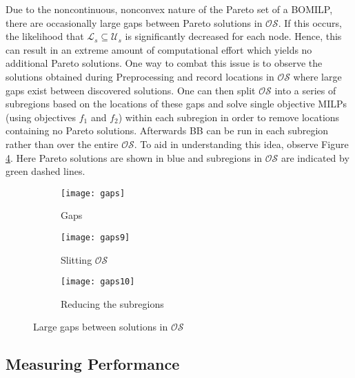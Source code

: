 \documentclass[11.5pt]{article}
\newcommand{\U}{\mathcal{U}}
\renewcommand{\L}{\mathcal{L}}
\newcommand{\OS}{\mathcal{OS}}
\begin{document}
Due to the noncontinuous, nonconvex nature of the Pareto set of a BOMILP, there are occasionally large gaps between Pareto solutions in $\OS$. If this occurs, the likelihood that $\L_s \subseteq \U_s$ is significantly decreased for each node. Hence, this can result in an extreme amount of computational effort which yields no additional Pareto solutions. One way to combat this issue is to observe the solutions obtained during Preprocessing and record locations in $\OS$ where large gaps exist between discovered solutions. One can then split $\OS$ into a series of subregions based on the locations of these gaps and solve single objective MILPs (using objectives $f_1$ and $f_2$) within each subregion in order to remove locations containing no Pareto solutions. Afterwards BB can be run in each subregion rather than over the entire $\OS$. To aid in understanding this idea, observe Figure \ref{gaps_fig}. Here Pareto solutions are shown in blue and subregions in $\OS$ are indicated by green dashed lines.

\begin{figure}
\begin{subfigure}[h]{.32\textwidth}
\centering
\texttt{[image: gaps]}
\caption{Gaps}
\label{gaps1}
\end{subfigure} 
\begin{subfigure}[h]{.32\textwidth}
\centering
\texttt{[image: gaps9]}
\caption{Slitting $\OS$}
\label{gaps2}
\end{subfigure}
\begin{subfigure}[h]{.32\textwidth}
\centering
\texttt{[image: gaps10]}
\caption{Reducing the subregions}
\label{gaps3}
\end{subfigure}
\caption{Large gaps between solutions in $\OS$}
\label{gaps_fig}
\end{figure}

\subsection{Measuring Performance} \label{sec:gap}
\end{document}

